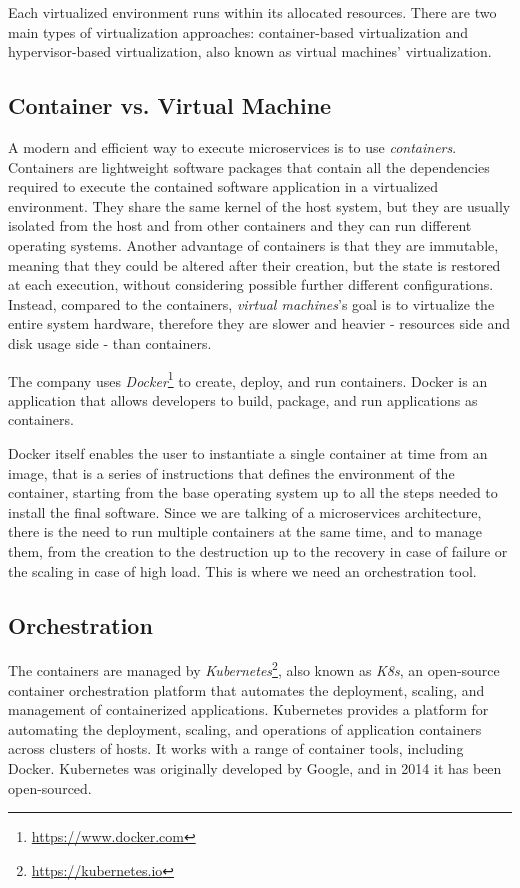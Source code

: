 Each virtualized environment runs within its allocated resources. There are two main types of virtualization approaches: container-based virtualization and hypervisor-based virtualization, also known as virtual machines' virtualization.

\subsection{Container vs. Virtual Machine}

A modern and efficient way to execute microservices is to use \textit{containers}. \\
Containers are lightweight software packages that contain all the dependencies required to execute the contained software application in a virtualized environment. They share the same kernel of the host system, but they are usually isolated from the host and from other containers and they can run different operating systems. Another advantage of containers is that they are immutable, meaning that they could be altered after their creation, but the state is restored at each execution, without considering possible further different configurations.\\
Instead, compared to the containers, \textit{virtual machines}'s goal is to virtualize the entire system hardware, therefore they are slower and heavier - resources side and disk usage side - than containers.

The company uses \textit{Docker}\footnote{\url{https://www.docker.com}} to create, deploy, and run containers. Docker is an application that allows developers to build, package, and run applications as containers.

Docker itself enables the user to instantiate a single container at time from an image, that is a series of instructions that defines the environment of the container, starting from the base operating system up to all the steps needed to install the final software. Since we are talking of a microservices architecture, there is the need to run multiple containers at the same time, and to manage them, from the creation to the destruction up to the recovery in case of failure or the scaling in case of high load. This is where we need an orchestration tool.

\subsection{Orchestration}

The containers are managed by \textit{Kubernetes}\footnote{\url{https://kubernetes.io}}, also known as \textit{K8s}, an open-source container orchestration platform that automates the deployment, scaling, and management of containerized applications. Kubernetes provides a platform for automating the deployment, scaling, and operations of application containers across clusters of hosts. It works with a range of container tools, including Docker. Kubernetes was originally developed by Google, and in 2014 it has been open-sourced.~\cite{kubernetes-overview}

